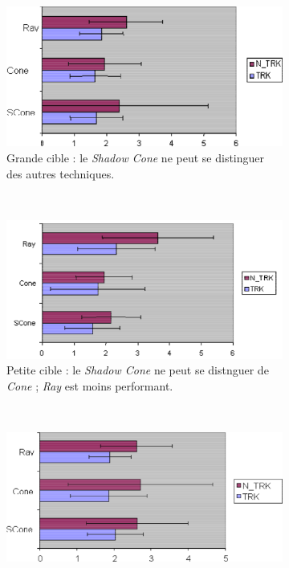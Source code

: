 	\begin{figure}[!htbp]
		\begin{subfigure}[t]{0.49\textwidth}
			\centering
			\includegraphics[width=\textwidth]{figures/ch2/shadowSLarge}
			\caption{Grande cible : le \emph{Shadow Cone} ne peut se distinguer des autres techniques.}
			\label{fig:shadowSLarge}
		\end{subfigure}
		~
		\begin{subfigure}[t]{0.49\textwidth}
			\centering
			\includegraphics[width=\textwidth]{figures/ch2/shadowSSmall}
			\caption{Petite cible : le \emph{Shadow Cone} ne peut se distnguer de \emph{Cone} ; \emph{Ray} est moins performant.}
			\label{fig:shadowSSmall}
		\end{subfigure}
		~
		\begin{subfigure}[t]{0.49\textwidth}
			\centering
			\includegraphics[width=\textwidth]{figures/ch2/shadowPLarge}

\end{subfigure}
\end{figure}
